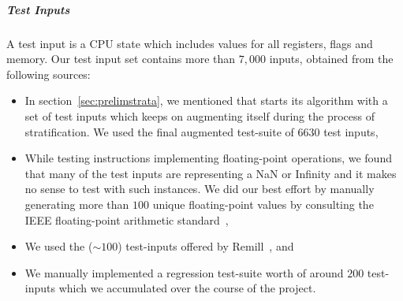 \subparagraph{Test Inputs} %
A test input is a CPU state which includes values for all registers, flags and memory. Our test input set contains more than $7,000$ inputs, obtained from the following sources: 
%    
\begin{itemize}
 \item In section~\ref{sec:prelimstrata}, we mentioned that \Strata starts its 
 algorithm with a set of test inputs which keeps on augmenting itself during 
 the process of stratification. We used the final augmented test-suite of  
 $6630$ test inputs,
 
 \item While testing instructions implementing floating-point operations, we 
 found that many of the test inputs are representing a NaN or Infinity and it 
 makes no sense to test with such instances. We did our best effort by manually 
 generating more than $100$ unique floating-point values by  consulting the 
 IEEE floating-point arithmetic standard~\cite{FP}, 
 
 \item We used the (${\sim}100$) test-inputs offered by Remill~\cite{Remill}, 
 and 

 \item We manually implemented a regression test-suite worth of around $200$ 
 test-inputs which we accumulated over the course of the project.


\end{itemize}

